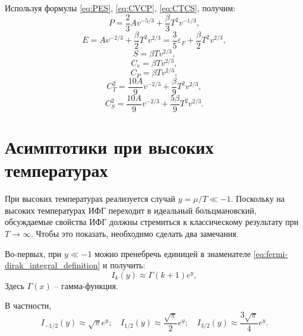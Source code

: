 Используя формулы \eqref{eq:PES}, \eqref{eq:CVCP}, \eqref{eq:CTCS}, получим:
\begin{equation}
    \label{eq:P_lt}
    P = \frac{2}{3}Av^{-5/3} + \frac{\beta}{3}T^2 v^{-1/3},
\end{equation}
\begin{equation}
    \label{eq:E_lt}
    E = Av^{-2/3} + \frac{\beta}{2}T^2 v^{2/3} = \frac{3}{5}\varepsilon_F + \frac{\beta}{2}T^2 v^{2/3},
\end{equation}
\begin{equation}
    \label{eq:S_lt}
    S = \beta T v^{2/3},
\end{equation}
\begin{equation}
    \label{eq:cv_lt}
    C_v = \beta T v^{2/3},
\end{equation}
\begin{equation}
    \label{eq:cp_lt}
    C_P = \beta T v^{2/3},
\end{equation}
\begin{equation}
    \label{eq:ct2_lt}
    C_T^2 = \frac{10A}{9}v^{-2/3} + \frac{\beta}{9}T^2 v^{2/3},
\end{equation}
\begin{equation}
    \label{eq:cs2_lt}
    C_S^2 = \frac{10A}{9}v^{-2/3} + \frac{5\beta}{9}T^2 v^{2/3}.
\end{equation}

\section{Асимптотики при высоких температурах}
\label{sec:asymp_high}
При высоких температурах реализуется случай $y = \mu / T \ll -1$.
Поскольку на высоких температурах ИФГ переходит в идеальный больцмановский, обсуждаемые свойства ИФГ должны стремиться к классическому результату при $T \to \infty$.
Чтобы это показать, необходимо сделать два замечания.

Во-первых, при $y \ll -1$ можно пренебречь единицей в знаменателе \eqref{eq:fermi-dirak_integral_definition} и получить:
\begin{equation}
    \label{eq:ifg_hightemp}
    I_{k}(y)\approx \Gamma(k + 1)e^{y},
\end{equation}
Здесь $\Gamma(x)$ -- гамма-функция.

В частности,
\begin{equation*}
    I_{-1/2}(y)\approx \sqrt{\pi}e^{y};\quad I_{1/2}(y)\approx \frac{\sqrt{\pi}}{2}e^{y};\quad
    I_{3/2}(y)\approx \frac{3\sqrt{\pi}}{4}e^{y}.
\end{equation*}

